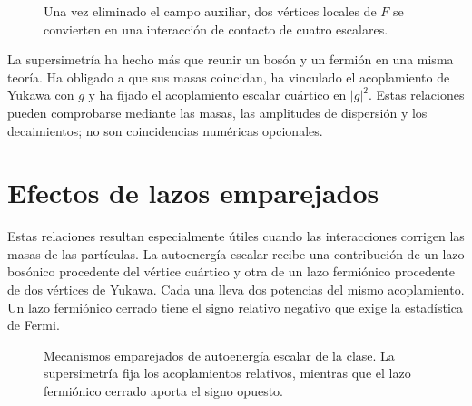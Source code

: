 \begin{figure}[H]
\centering
{}
\caption{Una vez eliminado el campo auxiliar, dos vértices locales de \(F\) se convierten en una interacción de contacto de cuatro escalares.}
\end{figure}

La supersimetría ha hecho más que reunir un bosón y un fermión en una misma teoría. Ha obligado a que sus masas coincidan, ha vinculado el acoplamiento de Yukawa con \(g\) y ha fijado el acoplamiento escalar cuártico en \(|g|^2\). Estas relaciones pueden comprobarse mediante las masas, las amplitudes de dispersión y los decaimientos; no son coincidencias numéricas opcionales.

\section{Efectos de lazos emparejados}

Estas relaciones resultan especialmente útiles cuando las interacciones corrigen las masas de las partículas. La autoenergía escalar recibe una contribución de un lazo bosónico procedente del vértice cuártico y otra de un lazo fermiónico procedente de dos vértices de Yukawa. Cada una lleva dos potencias del mismo acoplamiento. Un lazo fermiónico cerrado tiene el signo relativo negativo que exige la estadística de Fermi.

\begin{figure}[H]
\centering
{}
\caption{Mecanismos emparejados de autoenergía escalar de la clase. La supersimetría fija los acoplamientos relativos, mientras que el lazo fermiónico cerrado aporta el signo opuesto.}
\end{figure}

